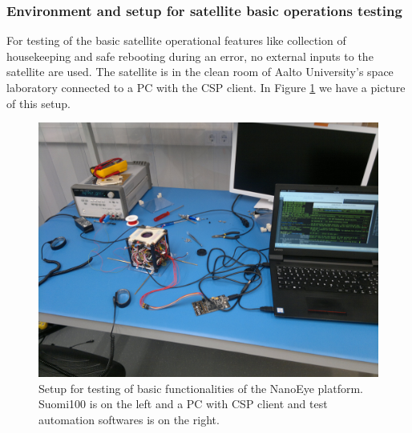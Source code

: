 \documentclass[english,12pt,a4paper,pdftex,elec,utf8]{aaltothesis}
\begin{document}
\subsubsection{Environment and setup for satellite basic operations testing}
For testing of the basic satellite operational features like collection of housekeeping and safe rebooting during an error, no external inputs to the satellite are used. The satellite is in the clean room of Aalto University's space laboratory connected to a PC with the CSP client. 
In Figure \ref{basictest} we have a picture of this setup.
\begin{figure}[h!]
\centering
\includegraphics[scale=0.3]{basicsetup}
\caption{Setup for testing of basic functionalities of the NanoEye platform. Suomi100 is on the left and a PC with CSP client and test automation softwares is on the right.}
\label{basictest}
\end{figure}  
\end{document}
